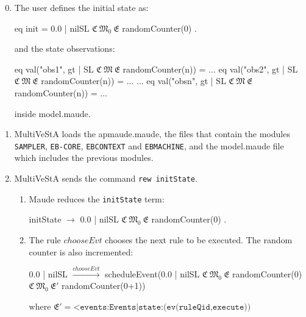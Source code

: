 

\begin{enumerate}
    \setcounter{enumi}{-1}
    \item The user defines the initial state as:
    \begin{maude}
    
eq init = {0.0 | nilSL} $\mathfrak{C} \ \mathfrak{M}_{0}  \ \mathfrak{E}$ randomCounter(0) . \end{maude}
    and the state observations:
    \begin{maude}
    
eq val("obs1", {gt | SL} {$\mathfrak{C} \ \mathfrak{M}  \ \mathfrak{E}$ randomCounter(n)}) = ...
eq val("obs2", {gt | SL} {$\mathfrak{C} \ \mathfrak{M}  \ \mathfrak{E}$ randomCounter(n)}) = ...
...
eq val("obsn", {gt | SL} {$\mathfrak{C} \ \mathfrak{M}  \ \mathfrak{E}$ randomCounter(n)}) = ...\end{maude}
    inside model.maude.
    
    \item MultiVeStA loads the apmaude.maude, the files that contain the modules \texttt{SAMPLER}, \texttt{EB-CORE}, \texttt{EBCONTEXT} and \texttt{EBMACHINE}, and the model.maude file which includes the previous modules.
    \item MultiVeStA sends the command \texttt{rew initState}. 
    \begin{enumerate}
        \item Maude reduces the \texttt{initState} term:
        \begin{maude}

initState $\rightarrow$ {0.0 | nilSL} {$\mathfrak{C} \ \mathfrak{M}_{0}  \ \mathfrak{E}$  randomCounter(0)} .\end{maude}
        \item The rule $chooseEvt$ chooses the next rule to be executed. The random counter is also incremented:
        \begin{maude}
 
{0.0 | nilSL }             $\xrightarrow{chooseEvt}$      scheduleEvent({0.0 | nilSL } 
{$\mathfrak{C} \ \mathfrak{M}_{0} \ \mathfrak{E}$ randomCounter(0)}              {$\mathfrak{C} \ \mathfrak{M}_{0} \ \mathfrak{E'}$ randomCounter(0+1)})\end{maude}
        where $\mathfrak{E'} = \texttt{<events:Events|state:(ev(ruleQid,execute))}$  
        

\end{enumerate}
\end{enumerate}
